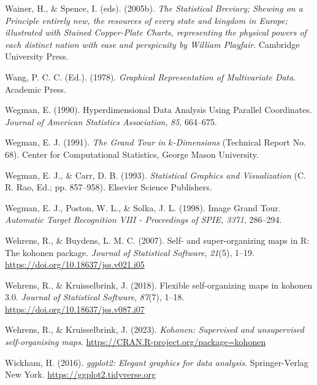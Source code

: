 \documentclass[
  letterpaper,
]{book}
\newlength{\cslhangindent}
\newlength{\cslentryspacingunit} %
\newenvironment{CSLReferences}[2] %
 {%
  \setlength{\parindent}{0pt}
  \ifodd #1
  \let\oldpar\par
  \def\par{\hangindent=\cslhangindent\oldpar}
  \fi
  \setlength{\parskip}{#2\cslentryspacingunit}
 }%
 {}
\begin{document}
\begin{CSLReferences}{1}{0}
\leavevmode{}%
Wainer, H., \& Spence, I. (eds). (2005b). \emph{The {S}tatistical
{B}reviary; {S}hewing on a {P}rinciple entirely new, the resources of
every state and kingdom in {E}urope; illustrated with {S}tained
{C}opper-{P}late {C}harts, representing the physical powers of each
distinct nation with ease and perspicuity by {W}illiam {P}layfair}.
Cambridge University Press.

\leavevmode{}%
Wang, P. C. C. (Ed.). (1978). \emph{{G}raphical {R}epresentation of
{M}ultivariate {D}ata}. Academic Press.

\leavevmode{}%
Wegman, E. (1990). {H}yperdimensional {D}ata {A}nalysis {U}sing
{P}arallel {C}oordinates. \emph{Journal of American Statistics
Association}, \emph{85}, 664--675.

\leavevmode{}%
Wegman, E. J. (1991). \emph{The {G}rand {T}our in \(k\)-{D}imensions}
(Technical Report No. 68). Center for Computational Statistics, George
Mason University.

\leavevmode{}%
Wegman, E. J., \& Carr, D. B. (1993). \emph{{S}tatistical {G}raphics and
{V}isualization} (C. R. Rao, Ed.; pp. 857--958). Elsevier Science
Publishers.

\leavevmode{}%
Wegman, E. J., Poston, W. L., \& Solka, J. L. (1998). Image {G}rand
{T}our. \emph{Automatic Target Recognition VIII - Proceedings of SPIE,
3371}, 286--294.

\leavevmode{}%
Wehrens, R., \& Buydens, L. M. C. (2007). Self- and super-organizing
maps in {R}: The {kohonen} package. \emph{Journal of Statistical
Software}, \emph{21}(5), 1--19.
\url{https://doi.org/10.18637/jss.v021.i05}

\leavevmode{}%
Wehrens, R., \& Kruisselbrink, J. (2018). Flexible self-organizing maps
in {kohonen} 3.0. \emph{Journal of Statistical Software}, \emph{87}(7),
1--18. \url{https://doi.org/10.18637/jss.v087.i07}

\leavevmode{}%
Wehrens, R., \& Kruisselbrink, J. (2023). \emph{Kohonen: Supervised and
unsupervised self-organising maps}.
\url{https://CRAN.R-project.org/package=kohonen}

\leavevmode{}%
Wickham, H. (2016). \emph{ggplot2: Elegant graphics for data analysis}.
Springer-Verlag New York. \url{https://ggplot2.tidyverse.org}


\end{CSLReferences}
\end{document}
